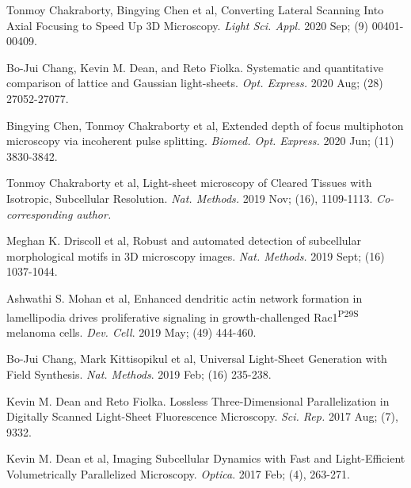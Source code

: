 \documentclass[10pt]{res}
\begin{document}
\begin{resume}
\begin{etaremune}
\item Tonmoy Chakraborty, Bingying Chen et al, Converting Lateral Scanning Into Axial Focusing to Speed Up 3D Microscopy. {\it Light Sci. Appl.} 2020 Sep; (9) 00401-00409.

\item Bo-Jui Chang, Kevin M. Dean, and Reto Fiolka.  Systematic and quantitative comparison of lattice and Gaussian light-sheets.  {\it Opt. Express.} 2020 Aug; (28) 27052-27077.

\item Bingying Chen, Tonmoy Chakraborty et al,  Extended depth of focus multiphoton microscopy via incoherent pulse splitting. {\it Biomed. Opt. Express.} 2020 Jun; (11) 3830-3842.

\item Tonmoy Chakraborty et al, Light-sheet microscopy of Cleared Tissues with Isotropic, Subcellular Resolution. {\it Nat. Methods.} 2019 Nov; (16), 1109-1113.  {\it Co-corresponding author.}

\item Meghan K. Driscoll et al, Robust and automated detection of subcellular morphological motifs in 3D microscopy images. {\it Nat. Methods.} 2019 Sept; (16) 1037-1044.  

\item Ashwathi S. Mohan et al, Enhanced dendritic actin network formation in lamellipodia drives proliferative signaling in growth-challenged Rac1\textsuperscript{P29S} melanoma cells.  
{\it Dev. Cell}.  2019 May; (49) 444-460.

\item Bo-Jui Chang, Mark Kittisopikul et al, Universal Light-Sheet Generation with Field Synthesis. {\it Nat. Methods}. 2019  Feb; (16) 235-238. 

\item Kevin M. Dean and Reto Fiolka.  Lossless Three-Dimensional Parallelization in Digitally Scanned Light-Sheet Fluorescence Microscopy.  {\it Sci. Rep.} 2017 Aug; (7), 9332.  

\item Kevin M. Dean et al, Imaging Subcellular Dynamics with Fast and Light-Efficient Volumetrically Parallelized Microscopy. {\it Optica}.  2017 Feb; (4), 263-271.


\end{etaremune}
\end{resume}
\end{document}
